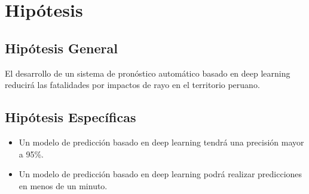 \section{Hipótesis}
\subsection{Hipótesis General}

El desarrollo de un sistema de pronóstico automático basado en deep learning 
reducirá las fatalidades por impactos de rayo en el territorio peruano.

\subsection{Hipótesis Específicas}

\begin{itemize}
  \item Un modelo de predicción basado en deep learning tendrá una precisión 
  mayor a 95\%.
  \item Un modelo de predicción basado en deep learning podrá realizar 
  predicciones en menos de un minuto.
\end{itemize}